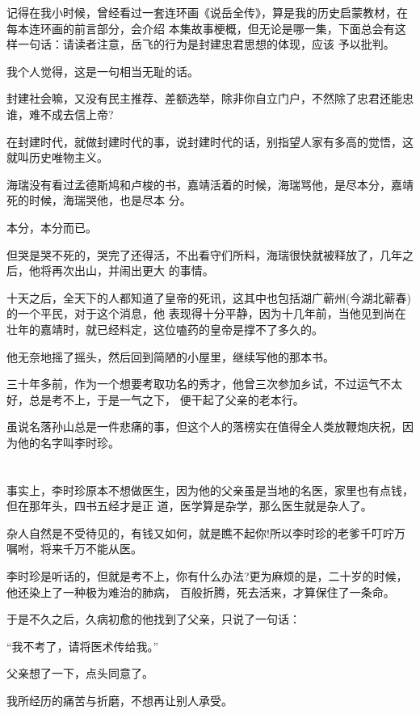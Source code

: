 \documentclass[11pt,a4paper,onecolumn]{article}
\begin{document}
记得在我小时候，曾经看过一套连环画《说岳全传》，算是我的历史启蒙教材，在每本连环画的前言部分，会介绍
本集故事梗概，但无论是哪一集，下面总会有这样一句话：请读者注意，岳飞的行为是封建忠君思想的体现，应该
予以批判。

我个人觉得，这是一句相当无耻的话。

封建社会嘛，又没有民主推荐、差额选举，除非你自立门户，不然除了忠君还能忠谁，难不成去信上帝?

在封建时代，就做封建时代的事，说封建时代的话，别指望人家有多高的觉悟，这就叫历史唯物主义。

海瑞没有看过孟德斯鸠和卢梭的书，嘉靖活着的时候，海瑞骂他，是尽本分，嘉靖死的时候，海瑞哭他，也是尽本
分。

本分，本分而已。

但哭是哭不死的，哭完了还得活，不出看守们所料，海瑞很快就被释放了，几年之后，他将再次出山，并闹出更大
的事情。

十天之后，全天下的人都知道了皇帝的死讯，这其中也包括湖广蕲州(今湖北蕲春)的一个平民，对于这个消息，他
表现得十分平静，因为十几年前，当他见到尚在壮年的嘉靖时，就已经料定，这位嗑药的皇帝是撑不了多久的。

他无奈地摇了摇头，然后回到简陋的小屋里，继续写他的那本书。

三十年多前，作为一个想要考取功名的秀才，他曾三次参加乡试，不过运气不太好，总是考不上，于是一气之下，
便干起了父亲的老本行。

虽说名落孙山总是一件悲痛的事，但这个人的落榜实在值得全人类放鞭炮庆祝，因为他的名字叫李时珍。

\section[\thesection]{}

事实上，李时珍原本不想做医生，因为他的父亲虽是当地的名医，家里也有点钱，但在那年头，四书五经才是正
道，医学算是杂学，那么医生就是杂人了。

杂人自然是不受待见的，有钱又如何，就是瞧不起你!所以李时珍的老爹千叮咛万嘱咐，将来千万不能从医。

李时珍是听话的，但就是考不上，你有什么办法?更为麻烦的是，二十岁的时候，他还染上了一种极为难治的肺病，
百般折腾，死去活来，才算保住了一条命。

于是不久之后，久病初愈的他找到了父亲，只说了一句话：

``我不考了，请将医术传给我。''

父亲想了一下，点头同意了。

我所经历的痛苦与折磨，不想再让别人承受。
\end{document}
